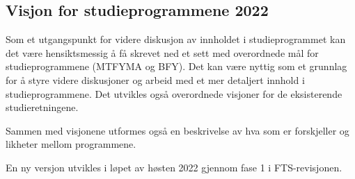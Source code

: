 \subsection{Visjon for studieprogrammene 2022}

Som et utgangspunkt for videre diskusjon av innholdet i studieprogrammet kan det være hensiktsmessig å få skrevet ned et sett med overordnede mål for studieprogrammene (MTFYMA og BFY). Det kan være nyttig som et grunnlag for å styre videre diskusjoner og arbeid med et mer detaljert innhold i studieprogrammene. Det utvikles også overordnede visjoner for de eksisterende studieretningene.

Sammen med visjonene utformes også en beskrivelse av hva som er forskjeller og likheter mellom programmene.

En ny versjon utvikles i løpet av høsten 2022 gjennom fase 1 i FTS-revisjonen.
